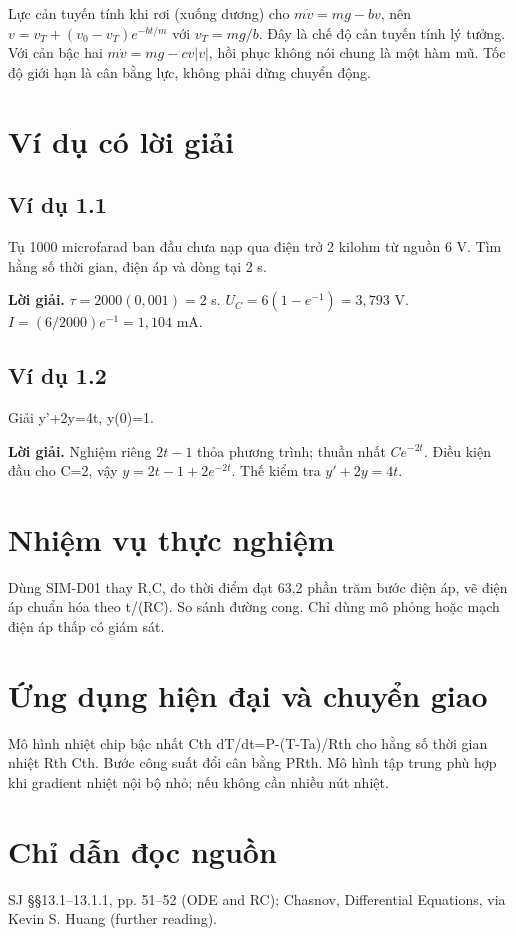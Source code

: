 \documentclass[11pt,a4paper,openany]{book}
\begin{document}
Lực cản tuyến tính khi rơi (xuống dương) cho $m\dot v=mg-bv$, nên $v=v_T+(v_0-v_T)e^{-bt/m}$ với $v_T=mg/b$. Đây là chế độ cản tuyến tính lý tưởng. Với cản bậc hai $m\dot v=mg-cv|v|$, hồi phục không nói chung là một hàm mũ. Tốc độ giới hạn là cân bằng lực, không phải dừng chuyển động.
\begin{center}
\end{center}
\section{Ví dụ có lời giải}
\subsection*{Ví dụ 1.1}
Tụ 1000 microfarad ban đầu chưa nạp qua điện trở 2 kilohm từ nguồn 6 V. Tìm hằng số thời gian, điện áp và dòng tại 2 s.

\textbf{Lời giải.} $\tau=2000(0{,}001)=2$ s. $U_C=6(1-e^{-1})=3{,}793$ V. $I=(6/2000)e^{-1}=1{,}104$ mA.
\subsection*{Ví dụ 1.2}
Giải y'+2y=4t, y(0)=1.

\textbf{Lời giải.} Nghiệm riêng $2t-1$ thỏa phương trình; thuần nhất $Ce^{-2t}$. Điều kiện đầu cho C=2, vậy $y=2t-1+2e^{-2t}$. Thế kiểm tra $y'+2y=4t$.
\section{Nhiệm vụ thực nghiệm}
Dùng SIM-D01 thay R,C, đo thời điểm đạt 63,2 phần trăm bước điện áp, vẽ điện áp chuẩn hóa theo t/(RC). So sánh đường cong. Chỉ dùng mô phỏng hoặc mạch điện áp thấp có giám sát.
\section{Ứng dụng hiện đại và chuyển giao}
Mô hình nhiệt chip bậc nhất Cth dT/dt=P-(T-Ta)/Rth cho hằng số thời gian nhiệt Rth Cth. Bước công suất đổi cân bằng PRth. Mô hình tập trung phù hợp khi gradient nhiệt nội bộ nhỏ; nếu không cần nhiều nút nhiệt.
\section{Chỉ dẫn đọc nguồn}
SJ §§13.1–13.1.1, pp. 51–52 (ODE and RC); Chasnov, Differential Equations, via Kevin S. Huang (further reading).
\end{document}

